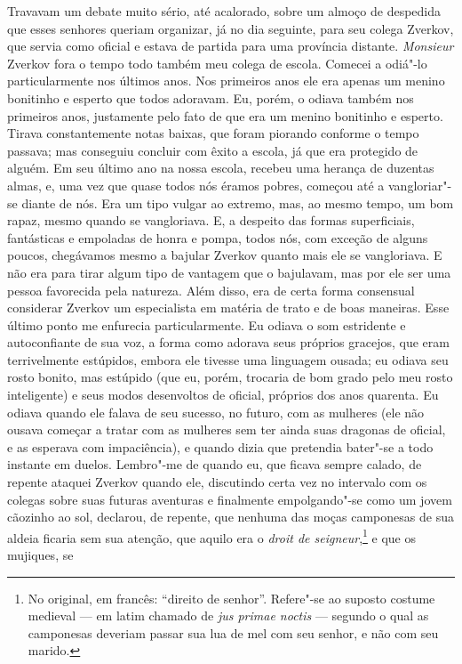 Travavam um debate muito sério, até acalorado, sobre um almoço de despedida que
esses senhores queriam organizar, já no dia seguinte, para seu colega Zverkov,
que servia como oficial e estava de partida para uma província distante.
\textit{Monsieur} Zverkov fora o tempo todo também meu colega de escola.
Comecei a odiá"-lo particularmente nos últimos anos. Nos primeiros anos ele era
apenas um menino bonitinho e esperto que todos adoravam. Eu, porém, o odiava
também nos primeiros anos, justamente pelo fato de que era um menino bonitinho
e esperto.  Tirava constantemente notas baixas, que foram piorando conforme o
tempo passava; mas conseguiu concluir com êxito a escola, já que era protegido
de alguém. Em seu último ano na nossa escola, recebeu uma herança de duzentas
almas, e, uma vez que quase todos nós éramos pobres, começou até a
vangloriar"-se diante de nós. Era um tipo vulgar ao extremo, mas, ao mesmo
tempo, um bom rapaz, mesmo quando se vangloriava. E, a despeito das formas
superficiais, fantásticas e empoladas de honra e pompa, todos nós, com exceção
de alguns poucos, chegávamos mesmo a bajular Zverkov quanto mais ele se
vangloriava. E não era para tirar algum tipo de vantagem que o bajulavam, mas
por ele ser uma pessoa favorecida pela natureza. Além disso, era de certa forma
consensual considerar Zverkov um especialista em matéria de trato e de boas
maneiras. Esse último ponto me enfurecia particularmente. Eu odiava o som
estridente e autoconfiante de sua voz, a forma como adorava seus próprios
gracejos, que eram terrivelmente estúpidos, embora ele tivesse uma linguagem
ousada; eu odiava seu rosto bonito, mas estúpido (que eu, porém, trocaria de
bom grado pelo meu rosto inteligente) e seus modos desenvoltos de oficial,
próprios dos anos quarenta. Eu odiava quando ele falava de seu sucesso, no
futuro, com as mulheres (ele não ousava começar a tratar com as mulheres sem
ter ainda suas dragonas de oficial, e as esperava com impaciência), e quando
dizia que pretendia bater"-se a todo instante em duelos. Lembro"-me de quando eu,
que ficava sempre calado, de repente ataquei Zverkov quando ele, discutindo
certa vez no intervalo com os colegas sobre suas futuras aventuras e finalmente
empolgando"-se como um jovem cãozinho ao sol, declarou, de repente, que nenhuma
das moças camponesas de sua aldeia ficaria sem sua atenção, que aquilo era o
\textit{droit de seigneur},\footnote{ No original, em francês: “direito de
senhor”. Refere"-se ao suposto costume medieval --- em latim chamado de
\textit{jus primae noctis} --- segundo o qual as camponesas deveriam passar sua
lua de mel com seu senhor, e não com seu marido.} e que os mujiques, se
